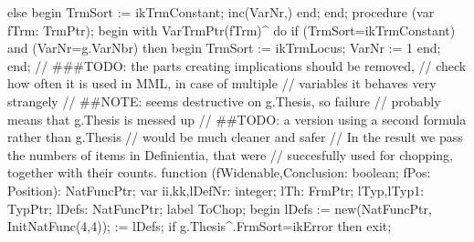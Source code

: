         else begin TrmSort := ikTrmConstant; inc(VarNr,) end;
end;
\eatline
{}\nwendcode{}\nwdocspar
\nwenddocs{}\endmoddef\nwstartdeflinemarkup{}\nwenddeflinemarkup
procedure (var fTrm: TrmPtr);
begin
   with VarTrmPtr(fTrm)^ do
      if (TrmSort=ikTrmConstant) and (VarNr=g.VarNbr) then
      begin TrmSort := ikTrmLocus; VarNr := 1 end;
end;
\eatline
{}\nwendcode{}\nwdocspar
\nwenddocs{}\endmoddef\nwstartdeflinemarkup{}\nwenddeflinemarkup
// ###TODO: the parts creating implications should be removed,
//          check how often it is used in MML, in case of multiple
//          variables it behaves very strangely
// ##NOTE: seems destructive on g.Thesis, so failure
//         probably means that g.Thesis is messed up
// ##TODO: a version using a second formula rather than g.Thesis
//         would be much cleaner and safer
// In the result we pass the numbers of items in Definientia, that were
// succesfully used for chopping, together with their counts.
function (fWidenable,Conclusion: boolean;
                  fPos: Position): NatFuncPtr;
var
   ii,kk,lDefNr: integer;
   lTh: FrmPtr;
   lTyp,lTyp1: TypPtr;
   lDefs: NatFuncPtr;
label ToChop;
begin
   lDefs := new(NatFuncPtr, InitNatFunc(4,4));
    := lDefs;
   if g.Thesis^.FrmSort=ikError then exit;
